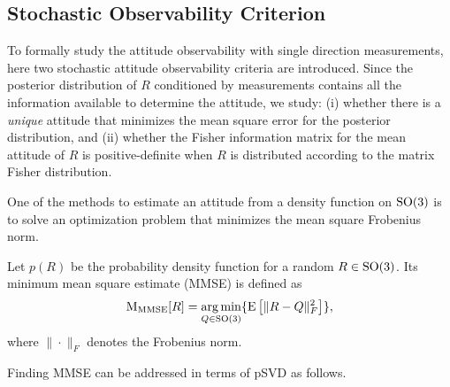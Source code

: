 \subsection{Stochastic Observability Criterion}

To formally study the attitude observability with single direction measurements, here two stochastic attitude observability criteria are introduced.
Since the posterior distribution of $R$ conditioned by measurements contains all the information available to determine the attitude, we study:
(i) whether there is a \textit{unique} attitude that minimizes the mean square error for the posterior distribution,
and (ii) whether the Fisher information matrix for the mean attitude of $R$ is positive-definite when $R$ is distributed according to the matrix Fisher distribution.

One of the methods to estimate an attitude from a density function on $\mathrm{SO}(3)$ is to solve an optimization problem that minimizes the mean square Frobenius norm.
\begin{definition}
	Let $p(R)$ be the probability density function for a random $R\in\mathrm{SO}(3)$. 
	Its minimum mean square estimate (MMSE) is defined as
	\begin{align}
		\mathrm{M}_{\mathrm{MMSE}} [R] = \operatorname*{arg\,min}_{Q\in\mathrm{SO}(3)} \{\mathrm{E}\left[ \| R - Q\|_F^2  \right]\},
	\end{align}
	where $\|\cdot \|_F$ denotes the Frobenius norm.
\end{definition}

Finding MMSE can be addressed in terms of pSVD as follows.


